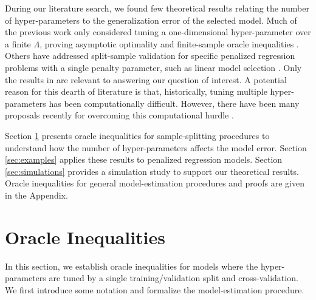 \documentclass[12pt]{article} %
\theoremstyle{definition}
\begin{document}
During our literature search, we found few theoretical results relating the number of hyper-parameters to the generalization error of the selected model. 
Much of the previous work only considered tuning a one-dimensional hyper-parameter over a finite $\Lambda$, proving asymptotic optimality \citep{van2004asymptotic} and finite-sample oracle inequalities \citep{van2003unified, gyorfi2006distribution}. Others have addressed split-sample validation for specific penalized regression problems with a single penalty parameter, such as linear model selection \citep{li1987asymptotic, shao1997asymptotic, golub1979generalized, chetverikov2016cross, chatterjee2015prediction}.
Only the results in \citet{lecue2012oracle} are relevant to answering our question of interest. A potential reason for this dearth of literature is that, historically, tuning multiple hyper-parameters has been computationally difficult. However, there have been many proposals recently for overcoming this computational hurdle \citep{bengio2000gradient, foo2008efficient, snoek2012practical}.

Section \ref{sec:main_results} presents oracle inequalities for sample-splitting procedures to understand how the number of hyper-parameters affects the model error.
Section \ref{sec:examples} applies these results to penalized regression models.
Section \ref{sec:simulations} provides a simulation study to support our theoretical results.
Oracle inequalities for general model-estimation procedures and proofs are given in the Appendix.



\section{Oracle Inequalities} \label{sec:main_results}

In this section, we establish oracle inequalities for models where the hyper-parameters are tuned by a single training/validation split and cross-validation. We first introduce some notation and formalize the model-estimation procedure. 
\end{document}

